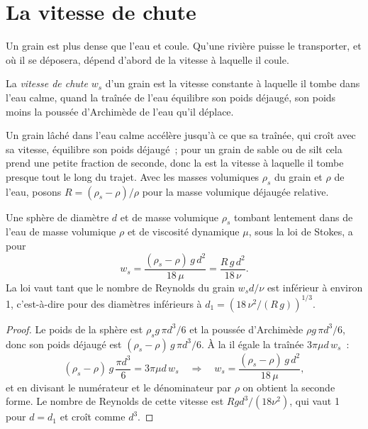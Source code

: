 \section{La vitesse de chute}\label{sec:b1:erosion-transport:settling}

Un grain est plus dense que l'eau et coule. Qu'une rivière puisse le transporter, et
où il se déposera, dépend d'abord de la vitesse à laquelle il coule.

\begin{definition}\label{def:b1:erosion-transport:settling}
La \emph{vitesse de chute} $w_s$ d'un grain est la
vitesse constante à laquelle il tombe dans l'eau calme, quand la traînée de
l'eau équilibre son poids déjaugé, son poids moins la poussée d'Archimède de
l'eau qu'il déplace.
\end{definition}

Un grain lâché dans l'eau calme accélère jusqu'à ce que sa traînée, qui croît avec
sa vitesse, équilibre son poids déjaugé~; pour un grain de sable ou de silt cela
prend une petite fraction de seconde, donc la  est la vitesse à laquelle
il tombe presque tout le long du trajet. Avec les masses volumiques $\rho_s$ du grain
et $\rho$ de l'eau, posons $R = (\rho_s - \rho)/\rho$ pour la masse volumique
déjaugée relative.

\begin{proposition}\label{prop:b1:erosion-transport:stokes}
Une sphère de diamètre $d$ et de masse volumique $\rho_s$ tombant lentement dans de l'eau de masse
volumique $\rho$ et de viscosité dynamique $\mu$, sous la loi de Stokes, a pour 
\[
  w_s = \frac{(\rho_s - \rho)\,g\,d^2}{18\,\mu} = \frac{R\,g\,d^2}{18\,\nu}.
\]
La loi vaut tant que le nombre de Reynolds du grain $w_s d/\nu$ est inférieur à environ 1,
c'est-à-dire pour des diamètres inférieurs à $d_1 = \left(18\,\nu^2/(R\,g)\right)^{1/3}$.
\end{proposition}

\begin{proof}
Le poids de la sphère est $\rho_s g\,\pi d^3/6$ et la poussée d'Archimède
$\rho g\,\pi d^3/6$, donc son poids déjaugé est $(\rho_s - \rho)\,g\,\pi d^3/6$.
À la  il égale la traînée $3\pi\mu d\,w_s$~:
\[
  (\rho_s - \rho)\,g\,\frac{\pi d^3}{6} = 3\pi\mu d\,w_s
  \quad\Longrightarrow\quad
  w_s = \frac{(\rho_s - \rho)\,g\,d^2}{18\,\mu},
\]
et en divisant le numérateur et le dénominateur par $\rho$ on obtient la seconde forme.
Le nombre de Reynolds de cette vitesse est $R g d^3/(18\nu^2)$, qui vaut 1 pour
$d = d_1$ et croît comme $d^3$.
\end{proof}

